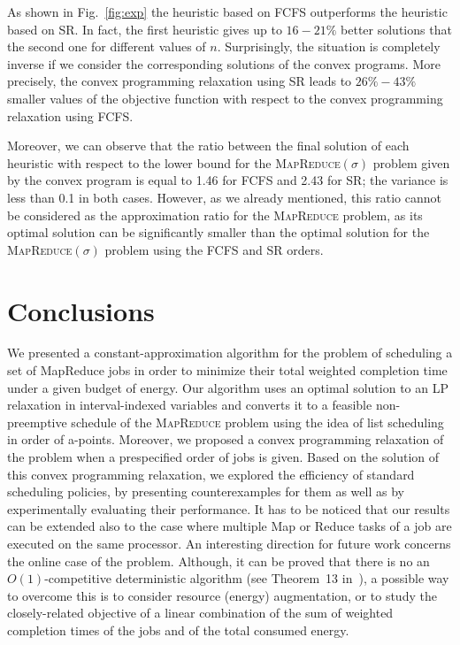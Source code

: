 \documentclass{llncs}
\newcommand{\mr}{\textsc{MapReduce}\xspace}
\newcommand{\mrs}{\textsc{MapReduce$(\sigma)$}\xspace}
\newcommand{\fcfs}{\textsc{FCFS}\xspace}
\newcommand{\sr}{\textsc{SR}\xspace}
\begin{document}
As shown in Fig.~\ref{fig:exp} the heuristic based on \fcfs outperforms the heuristic based on \sr.
In fact, the first heuristic gives up to $16-21\%$ better solutions that the second one for different values of $n$.
Surprisingly, the situation is completely inverse if we consider the corresponding solutions of the convex programs.
More precisely, the convex programming relaxation using \sr leads to $26\%-43\%$ smaller values of the objective function
with respect to the convex programming relaxation using \fcfs.

Moreover, we can observe that the ratio between the final solution of each heuristic with respect to the lower bound for the \mrs problem
given by the convex program is equal to 1.46 for \fcfs and 2.43 for \sr;
the variance is less than 0.1 in both cases.
However, as we already mentioned, this ratio cannot be considered as the approximation ratio for the \mr problem,
as its optimal solution can be significantly smaller than the optimal solution for the \mrs problem using the \fcfs and \sr orders.

\section{Conclusions}\label{se:con}

We presented a constant-approximation algorithm for the problem of scheduling a set of MapReduce jobs
in order to minimize their total weighted completion time under a given budget of energy.
Our algorithm uses an optimal solution to an LP relaxation in interval-indexed variables and converts it to a feasible
non-preemptive schedule of the \mr problem using the idea of list scheduling in order of a-points.
Moreover, we proposed a convex programming relaxation of the problem when a prespecified order of jobs is given.
Based on the solution of this convex programming relaxation, we explored the efficiency of standard scheduling policies,
by presenting counterexamples for them as well as by experimentally evaluating their performance.
It has to be noticed that our results can be extended also to the case where multiple Map or Reduce tasks of a job are executed on the same processor.
An interesting direction for future work concerns the online case of the problem.
Although, it can be proved that there is no an $O(1)$-competitive deterministic algorithm (see Theorem~13 in~\cite{BansalPS09}),
a possible way to overcome this  is to consider resource (energy) augmentation,
or to study the closely-related objective of a linear combination of the sum of weighted completion times of the jobs and of the total consumed energy.
\end{document}
